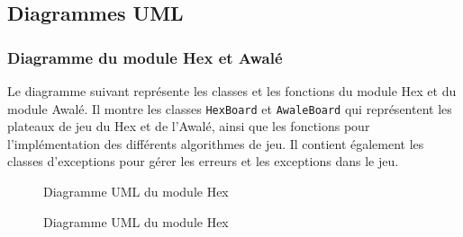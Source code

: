 \subsection{Diagrammes UML}

\subsubsection{Diagramme du module Hex et Awalé}

Le diagramme suivant représente les classes et les fonctions du module Hex et du module Awalé.
Il montre les classes \texttt{HexBoard} et \texttt{AwaleBoard} qui représentent les plateaux de jeu
du Hex et de l'Awalé, ainsi que les fonctions pour l'implémentation des différents algorithmes de jeu.
Il contient également les classes d'exceptions pour gérer les erreurs et les exceptions dans le jeu.

\begin{figure}[!htb]
    \centering
    \caption{Diagramme UML du module Hex}\label{Fig:UML_hex}
\end{figure}
\begin{figure}[!htb]
    \centering
    \caption{Diagramme UML du module Hex}\label{Fig:UML_hex}
\end{figure}


